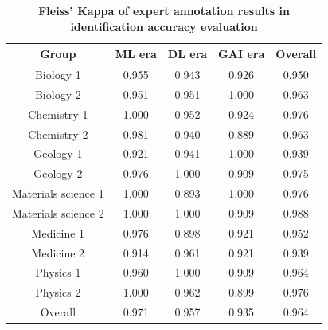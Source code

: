 \clearpage
\newpage
\begin{table}[ht]
\caption{\textbf{Fleiss’ Kappa of expert annotation results in identification accuracy evaluation}}
\centering
\begin{tabular}{@{}c|ccc|c@{}}
\toprule
Group               & ML era & DL era & GAI era & Overall \\ \midrule
Biology 1           & 0.955  & 0.943  & 0.926   & 0.950   \\
Biology 2           & 0.951  & 0.951  & 1.000   & 0.963   \\
Chemistry 1         & 1.000  & 0.952  & 0.924   & 0.976   \\
Chemistry 2         & 0.981  & 0.940  & 0.889   & 0.963   \\
Geology 1           & 0.921  & 0.941  & 1.000   & 0.939   \\
Geology 2           & 0.976  & 1.000  & 0.909   & 0.975   \\
Materials science 1 & 1.000  & 0.893  & 1.000   & 0.976   \\
Materials science 2 & 1.000  & 1.000  & 0.909   & 0.988   \\
Medicine 1          & 0.976  & 0.898  & 0.921   & 0.952   \\
Medicine 2          & 0.914  & 0.961  & 0.921   & 0.939   \\
Physics 1           & 0.960  & 1.000  & 0.909   & 0.964   \\
Physics 2           & 1.000  & 0.962  & 0.899   & 0.976   \\ \midrule
Overall             & 0.971  & 0.957  & 0.935   & 0.964   \\ \bottomrule
\end{tabular}
\label{tab3}
\end{table}

